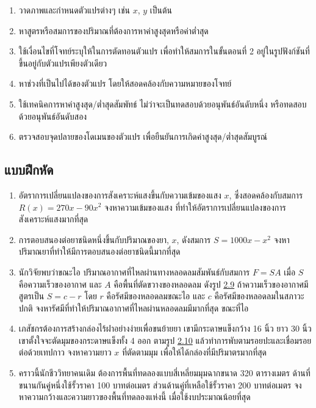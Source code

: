 \documentclass[
]{book}
\theoremstyle{definition}
\theoremstyle{definition}
\theoremstyle{definition}
\theoremstyle{definition}
\theoremstyle{remark}
\begin{document}
\begin{enumerate}
\def\labelenumi{\arabic{enumi}.}
\item
  วาดภาพและกำหนดตัวแปรต่างๆ เช่น \(x\), \(y\) เป็นต้น
\item
  หาสูตรหรือสมการของปริมาณที่ต้องการหาค่าสูงสุดหรือค่าต่ำสุด
\item
  ใช้เงื่อนไขที่โจทย์ระบุให้ในการตัดทอนตัวแปร เพื่อทำให้สมการในขั้นตอนที่ 2
  อยู่ในรูปฟังก์ชันที่ขึ้นอยู่กับตัวแปรเพียงตัวเดียว
\item
  หาช่วงที่เป็นไปได้ของตัวแปร โดยให้สอดคล้องกับความหมายของโจทย์
\item
  ใช้เทคนิคการหาค่าสูงสุด/ต่ำสุดสัมพัทธ์ ไม่ว่าจะเป็นทดสอบด้วยอนุพันธ์อันดับหนึ่ง
  หรือทดสอบด้วยอนุพันธ์อันดับสอง
\item
  ตรวจสอบจุดปลายของโดเมนของตัวแปร เพื่อยืนยันการเกิดค่าสูงสุด/ต่ำสุดสัมบูรณ์
\end{enumerate}

\subsection{แบบฝึกหัด}\label{uxe41uxe1auxe1auxe1duxe01uxe2buxe14-6}

\begin{enumerate}
\def\labelenumi{\arabic{enumi}.}
\item
  อัตราการเปลี่ยนแปลงของการสังเคราะห์แสงขึ้นกับความเข้มของแสง \(x\),
  ซึ่งสอดคล้องกับสมการ \(R(x)=270x-90x^2\) จงหาความเข้มของแสง
  ที่ทำให้อัตราการเปลี่ยนแปลงของการสังเคราะห์แสงมากที่สุด
\item
  การตอบสนองต่อยาชนิดหนึ่งขึ้นกับปริมาณของยา, \(x\), ดังสมการ \(S=1000x-x^2\)
  จงหาปริมาณยาที่ทำให้มีการตอบสนองต่อยาชนิดนี้มากที่สุด
\item
  นักวิจัยพบว่าขณะไอ ปริมาณอากาศที่ไหลผ่านทางหลอดลมสัมพันธ์กับสมการ \(F=SA\) เมื่อ \(S\)
  คือความเร็วของอากาศ และ \(A\) คือพื้นที่ตัดขวางของหลอดลม ดังรูป
  \hyperref[fig-artery]{2.9}
  ถ้าความเร็วของอากาศมีสูตรเป็น \(S=c-r\) โดย \(r\) คือรัศมีของหลอดลมขณะไอ และ \(c\)
  คือรัศมีของหลอดลมในสภาวะปกติ จงหารัศมีที่ทำให้ปริมาณอากาศที่ไหลผ่านหลอดลมมีมากที่สุด
  ขณะที่ไอ
\item
  เภสัชกรต้องการสร้างกล่องไร้ฝาอย่างง่ายเพื่อขนย้ายยา เขามีกระดาษแข็งกว้าง 16 นิ้ว
  ยาว 30 นิ้ว เขาตั้งใจจะตัดมุมของกระดาษแข็งทั้ง 4 ออก ตามรูป
  \hyperref[fig-box-area]{2.10}
  แล้วทำการพับตามรอยปะและเชื่อมรอยต่อด้วยเทปกาว จงหาความยาว \(x\) ที่ตัดตามมุม
  เพื่อให้ได้กล่องที่มีปริมาตรมากที่สุด
\item
  คราวนี้นักชีววิทยาคนเดิม ต้องการพื้นที่ทดลองแบบสี่เหลี่ยมมุมฉากขนาด 320 ตารางเมตร
  ด้านที่ขนานกันคู่หนึ่งใช้รั้วราคา 100 บาทต่อเมตร ส่วนด้านคู่ที่เหลือใช้รั้วราคา 200
  บาทต่อเมตร จงหาความกว้างและความยาวของพื้นที่ทดลองแห่งนี้ เมื่อใช้งบประมาณน้อยที่สุด
\end{enumerate}
\end{document}
